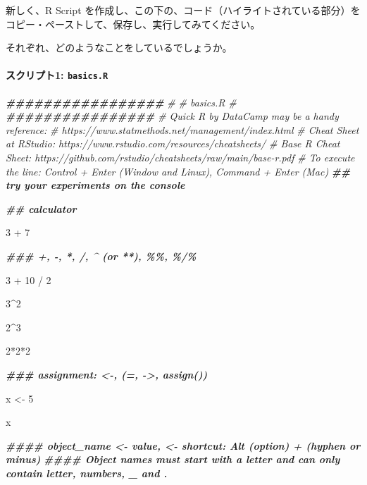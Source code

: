 \documentclass[
]{bxjsbook}
\newenvironment{Shaded}{\begin{snugshade}}{\end{snugshade}}
\newcommand{\CommentTok}[1]{\textcolor[rgb]{0.56,0.35,0.01}{\textit{#1}}}
\newcommand{\DecValTok}[1]{\textcolor[rgb]{0.00,0.00,0.81}{#1}}
\newcommand{\DocumentationTok}[1]{\textcolor[rgb]{0.56,0.35,0.01}{\textbf{\textit{#1}}}}
\newcommand{\NormalTok}[1]{#1}
\newcommand{\OtherTok}[1]{\textcolor[rgb]{0.56,0.35,0.01}{#1}}
\newcommand{\SpecialCharTok}[1]{\textcolor[rgb]{0.00,0.00,0.00}{#1}}
\theoremstyle{definition}
\theoremstyle{definition}
\theoremstyle{definition}
\theoremstyle{definition}
\theoremstyle{remark}
\begin{document}
新しく、R Script を作成し、この下の、コード（ハイライトされている部分）をコピー・ペーストして、保存し、実行してみてください。

それぞれ、どのようなことをしているでしょうか。

\hypertarget{ux30b9ux30afux30eaux30d7ux30c81-basics.r}{%
\paragraph{\texorpdfstring{スクリプト1: \texttt{basics.R}}{スクリプト1: basics.R}}\label{ux30b9ux30afux30eaux30d7ux30c81-basics.r}}

\begin{Shaded}
\begin{Highlighting}[]
\DocumentationTok{\#\#\#\#\#\#\#\#\#\#\#\#\#\#\#\#\#}
\CommentTok{\#}
\CommentTok{\# basics.R}
\CommentTok{\#}
\DocumentationTok{\#\#\#\#\#\#\#\#\#\#\#\#\#\#\#\#}
\CommentTok{\# \textquotesingle{}Quick R\textquotesingle{} by DataCamp may be a handy reference: }
\CommentTok{\#     https://www.statmethods.net/management/index.html}
\CommentTok{\# Cheat Sheet at RStudio: https://www.rstudio.com/resources/cheatsheets/}
\CommentTok{\# Base R Cheat Sheet: https://github.com/rstudio/cheatsheets/raw/main/base{-}r.pdf}
\CommentTok{\# To execute the line: Control + Enter (Window and Linux), Command + Enter (Mac)}
\DocumentationTok{\#\# try your experiments on the console}

\DocumentationTok{\#\# calculator}

\DecValTok{3} \SpecialCharTok{+} \DecValTok{7}

\DocumentationTok{\#\#\# +, {-}, *, /, \^{} (or **), \%\%, \%/\%}

\DecValTok{3} \SpecialCharTok{+} \DecValTok{10} \SpecialCharTok{/} \DecValTok{2}

\DecValTok{3}\SpecialCharTok{\^{}}\DecValTok{2}

\DecValTok{2}\SpecialCharTok{\^{}}\DecValTok{3}

\DecValTok{2}\SpecialCharTok{*}\DecValTok{2}\SpecialCharTok{*}\DecValTok{2}

\DocumentationTok{\#\#\# assignment: \textless{}{-}, (=, {-}\textgreater{}, assign()) }

\NormalTok{x }\OtherTok{\textless{}{-}} \DecValTok{5}

\NormalTok{x }

\DocumentationTok{\#\#\#\# object\_name \textless{}{-} value, \textquotesingle{}\textless{}{-}\textquotesingle{} shortcut: Alt (option) + \textquotesingle{}{-}\textquotesingle{} (hyphen or minus) }
\DocumentationTok{\#\#\#\# Object names must start with a letter and can only contain letter, numbers, \_ and .}


\end{Highlighting}
\end{Shaded}
\end{document}
